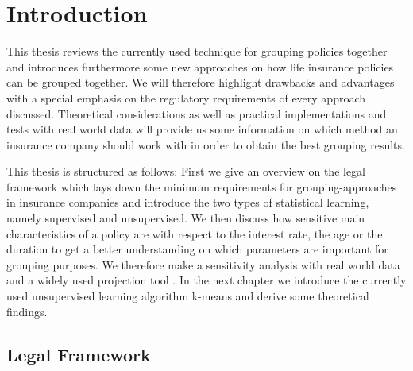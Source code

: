 

\chapter{Introduction}
\label{cha:introduction}

This thesis reviews the currently used technique for grouping policies together and introduces furthermore some new approaches on how life insurance policies can be grouped together. We will therefore highlight drawbacks and advantages with a special emphasis on the regulatory requirements of every approach discussed. Theoretical considerations as well as practical implementations and tests with real world data will provide us some information on which method an insurance company should work with in order to obtain the best grouping results.  

This thesis is structured as follows: First we give an overview on the legal framework which lays down the minimum requirements for grouping-approaches in insurance companies and introduce the two types of statistical learning, namely supervised and unsupervised. We then discuss how sensitive main characteristics of a policy are with respect to the interest rate, the age or the duration to get a better understanding on which parameters are important for grouping purposes. We therefore make a sensitivity analysis with real world data and a widely used projection tool . In the next chapter we introduce the currently used unsupervised learning algorithm k-means and derive some theoretical findings. 


\section{Legal Framework}

